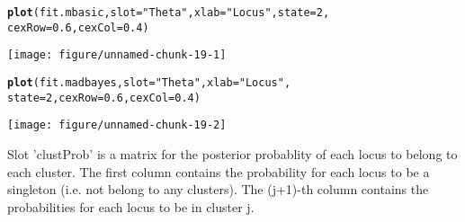 \documentclass[a4paper,10pt]{article}\usepackage[]{graphicx}\usepackage[]{color}
\makeatletter
\def\maxwidth{ %
  \ifdim\Gin@nat@width>\linewidth
    \linewidth
  \else
    \Gin@nat@width
  \fi
}
\newcommand{\hlnum}[1]{\textcolor[rgb]{0.686,0.059,0.569}{#1}}%
\newcommand{\hlstr}[1]{\textcolor[rgb]{0.192,0.494,0.8}{#1}}%
\newcommand{\hlstd}[1]{\textcolor[rgb]{0.345,0.345,0.345}{#1}}%
\newcommand{\hlkwc}[1]{\textcolor[rgb]{0.333,0.667,0.333}{#1}}%
\newcommand{\hlkwd}[1]{\textcolor[rgb]{0.737,0.353,0.396}{\textbf{#1}}}%
\newenvironment{kframe}{%
 \def\at@end@of@kframe{}%
 \ifinner\ifhmode%
  \def\at@end@of@kframe{\end{minipage}}%
  \begin{minipage}{\columnwidth}%
 \fi\fi%
 \def\FrameCommand##1{\hskip\@totalleftmargin \hskip-\fboxsep
 \colorbox{shadecolor}{##1}\hskip-\fboxsep
     \hskip-\linewidth \hskip-\@totalleftmargin \hskip\columnwidth}%
 \MakeFramed {\advance\hsize-\width
   \@totalleftmargin\z@ \linewidth\hsize
   \@setminipage}}%
 {\par\unskip\endMakeFramed%
 \at@end@of@kframe}
\newenvironment{knitrout}{}{} %
\makeatother
\begin{document}
\begin{knitrout}
\color{fgcolor}\begin{kframe}
\begin{alltt}
\hlkwd{plot}\hlstd{(fit.mbasic,} \hlkwc{slot} \hlstd{=} \hlstr{"Theta"}\hlstd{,} \hlkwc{xlab} \hlstd{=} \hlstr{"Locus"}\hlstd{,} \hlkwc{state} \hlstd{=} \hlnum{2}\hlstd{,}
    \hlkwc{cexRow} \hlstd{=} \hlnum{0.6}\hlstd{,} \hlkwc{cexCol} \hlstd{=} \hlnum{0.4}\hlstd{)}
\end{alltt}
\end{kframe}

{\centering \texttt{[image: figure/unnamed-chunk-19-1]} 

}


\begin{kframe}\begin{alltt}
\hlkwd{plot}\hlstd{(fit.madbayes,} \hlkwc{slot} \hlstd{=} \hlstr{"Theta"}\hlstd{,} \hlkwc{xlab} \hlstd{=} \hlstr{"Locus"}\hlstd{,}
    \hlkwc{state} \hlstd{=} \hlnum{2}\hlstd{,} \hlkwc{cexRow} \hlstd{=} \hlnum{0.6}\hlstd{,} \hlkwc{cexCol} \hlstd{=} \hlnum{0.4}\hlstd{)}
\end{alltt}
\end{kframe}

{\centering \texttt{[image: figure/unnamed-chunk-19-2]} 

}



\end{knitrout}

Slot 'clustProb' is a matrix for the posterior probablity of each locus to belong to each cluster. The first column contains the probability for each locus to be a singleton (i.e. not belong to any clusters). The (j+1)-th column contains the probabilities for each locus to be in cluster j.
\end{document}

